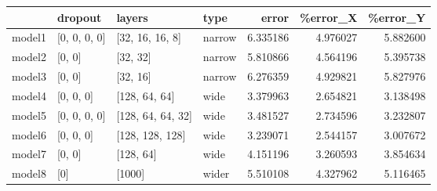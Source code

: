 \begin{tabular}{llllrrr}
\toprule
{} &       dropout &             layers &              type &     error &  \%error\_X &  \%error\_Y \\
\midrule
model1 &  [0, 0, 0, 0] &    [32, 16, 16, 8] &     narrow &  6.335186 &  4.976027 &  5.882600 \\
model2 &        [0, 0] &           [32, 32] &  narrow &  5.810866 &  4.564196 &  5.395738 \\
model3 &        [0, 0] &           [32, 16] &  narrow &  6.276359 &  4.929821 &  5.827976 \\
model4 &     [0, 0, 0] &      [128, 64, 64] &       wide &  3.379963 &  2.654821 &  3.138498 \\
model5 &  [0, 0, 0, 0] &  [128, 64, 64, 32] &       wide &  3.481527 &  2.734596 &  3.232807 \\
model6 &     [0, 0, 0] &    [128, 128, 128] &    wide &  3.239071 &  2.544157 &  3.007672 \\
model7 &        [0, 0] &          [128, 64] &    wide &  4.151196 &  3.260593 &  3.854634 \\
model8 &           [0] &             [1000] &   wider &  5.510108 &  4.327962 &  5.116465 \\
\bottomrule
\end{tabular}

